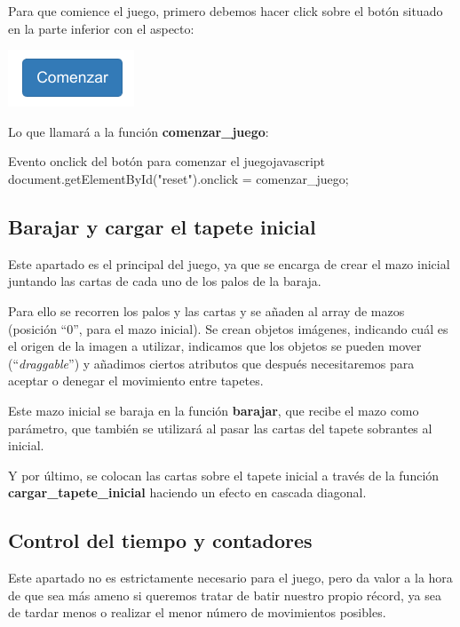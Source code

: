 \documentclass{\ClassPath/viu-tfm-template}
\begin{document}
Para que comience el juego, primero debemos hacer click sobre el botón situado en la parte inferior con el aspecto:

\vspace{-1.6em}
\begin{center}
    \includegraphics[width=0.2\linewidth]{img/boton.png}
\end{center}
\vspace{-1em}

Lo que llamará a la función \textbf{comenzar\_juego}:

\begin{mycode}{Evento onclick del botón para comenzar el juego}{javascript}{}
document.getElementById("reset").onclick = comenzar_juego;
\end{mycode}


\subsection{Barajar y cargar el tapete inicial}
Este apartado es el principal del juego, ya que se encarga de crear el mazo inicial  juntando las cartas de cada uno de los palos de la baraja.

Para ello se recorren los palos y las cartas y se añaden al array de mazos (posición “0”, para el mazo inicial). Se crean objetos imágenes, indicando cuál es el origen de la imagen a utilizar, indicamos que los objetos se pueden mover (“\textit{draggable}”) y añadimos ciertos atributos que después necesitaremos para aceptar o denegar el movimiento entre tapetes.

Este mazo inicial se baraja en la función \textbf{barajar}, que recibe el mazo como parámetro, que también se utilizará al pasar las cartas del tapete sobrantes al inicial.

Y por último, se colocan las cartas sobre el tapete inicial a través de la función \textbf{cargar\_tapete\_inicial} haciendo un efecto en cascada diagonal.


\subsection{Control del tiempo y contadores}
Este apartado no es estrictamente necesario para el juego, pero da valor a la hora de que sea más ameno si queremos tratar de batir nuestro propio récord, ya sea de tardar menos o realizar el menor número de movimientos posibles.
\end{document}
